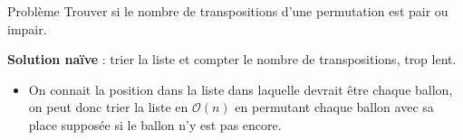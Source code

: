 \begin{frame}
    \frametitle{\problemtitle}
        \begin{block}
            {Problème} Trouver si le nombre de transpositions d'une permutation est pair ou impair.
        \end{block}
        \pause
        \textbf{Solution naïve} : trier la liste et compter le nombre de transpositions, trop lent.
        \pause
        \begin{itemize}
            \item<+-> On connait la position dans la liste dans laquelle devrait être chaque ballon, on peut donc trier la liste en $\mathcal{O}(n)$ en permutant chaque ballon avec sa place supposée si le ballon n'y est pas encore.
    \end{itemize}
\end{frame}
